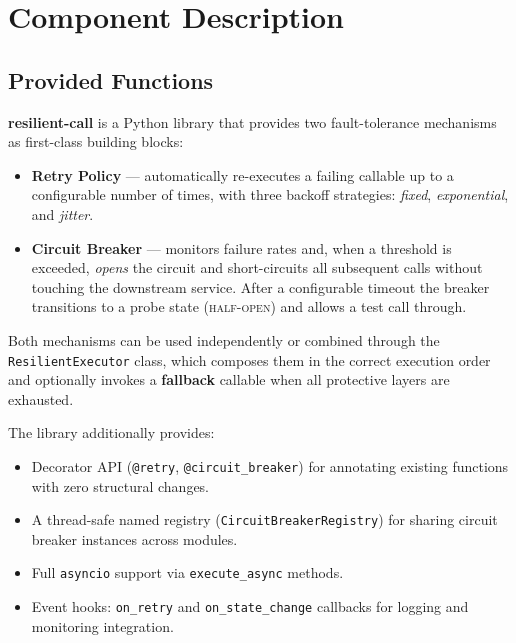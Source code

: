 \chapter{Component Description}
\label{ch:description}

\section{Provided Functions}
\label{sec:functions}

\textbf{resilient-call} is a Python library that provides two fault-tolerance
mechanisms as first-class building blocks:

\begin{itemize}[leftmargin=*, label=\textbullet]
    \item \textbf{Retry Policy} — automatically re-executes a failing callable
          up to a configurable number of times, with three backoff strategies:
          \textit{fixed}, \textit{exponential}, and \textit{jitter}.

    \item \textbf{Circuit Breaker} — monitors failure rates and, when a
          threshold is exceeded, \emph{opens} the circuit and short-circuits
          all subsequent calls without touching the downstream service.
          After a configurable timeout the breaker transitions to a probe state
          (\textsc{half-open}) and allows a test call through.
\end{itemize}

Both mechanisms can be used independently or combined through the
\texttt{ResilientExecutor} class, which composes them in the correct
execution order and optionally invokes a \textbf{fallback} callable when
all protective layers are exhausted.

The library additionally provides:

\begin{itemize}[leftmargin=*, label=\textbullet]
    \item Decorator API (\texttt{@retry}, \texttt{@circuit\_breaker}) for
          annotating existing functions with zero structural changes.
    \item A thread-safe named registry (\texttt{CircuitBreakerRegistry}) for
          sharing circuit breaker instances across modules.
    \item Full \texttt{asyncio} support via \texttt{execute\_async} methods.
    \item Event hooks: \texttt{on\_retry} and \texttt{on\_state\_change}
          callbacks for logging and monitoring integration.
\end{itemize}

